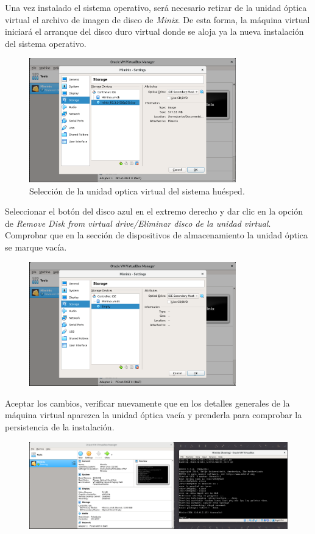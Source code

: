 \documentclass[12pt]{scrartcl}
\begin{document}
Una vez instalado el sistema operativo, será necesario retirar de la unidad óptica virtual el archivo de imagen de disco de \textit{Minix}. De esta forma, la máquina virtual iniciará el arranque del disco duro virtual donde se aloja ya la nueva instalación del sistema operativo.
\begin{figure}[H]
  \centering
  \includegraphics[width=0.8\textwidth]{vb/25.png}
  \caption{Selección de la unidad optica virtual del sistema huésped.}
\end{figure}

Seleccionar el botón del disco azul en el extremo derecho y dar clic en la opción de \textit{Remove Disk from virtual drive/Eliminar disco de la unidad virtual}.
Comprobar que en la sección de dispositivos de almacenamiento la unidad óptica se marque vacía. 
\begin{figure}[H]
  \centering
  \includegraphics[width=0.8\textwidth]{vb/26.png}
  \caption{}
\end{figure}

Aceptar los cambios, verificar nuevamente que en los detalles generales de la máquina virtual aparezca la unidad óptica vacía y prenderla para comprobar la persistencia de la instalación.

\begin{figure}[H]
  \centering
  \includegraphics[width=1\textwidth]{vb/28.png}
  \caption{}
\end{figure}
\end{document}
